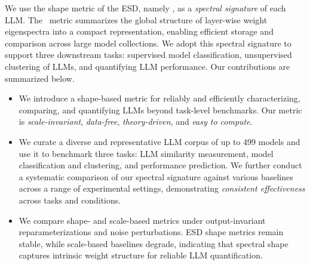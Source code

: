 We use the shape metric of the ESD, namely \ALPHAHILL, as a \emph{spectral signature} of each LLM. The \ALPHAHILL~metric summarizes the global structure of layer-wise weight eigenspectra into a compact representation, enabling efficient storage and comparison across large model collections. We adopt this spectral signature to support three downstream tasks: supervised model classification, unsupervised clustering of LLMs, and quantifying LLM performance.
Our contributions are summarized below.
%
\begin{itemize}
    \item We introduce a shape-based metric for reliably and efficiently characterizing, comparing, and quantifying LLMs beyond task-level benchmarks. Our metric is \emph{scale-invariant}, \emph{data-free}, \emph{theory-driven}, and \emph{easy to compute}. 
    \item We curate a diverse and representative LLM corpus of up to 499 models and use it to benchmark three tasks: LLM similarity measurement, model classification and clustering, and performance prediction. We further conduct a systematic comparison of our spectral signature against various baselines across a range of experimental settings, demonstrating \emph{consistent effectiveness} across tasks and conditions.
    \item We compare shape- and scale-based metrics under output-invariant reparameterizations and noise perturbations. ESD shape metrics remain stable, while scale-based baselines degrade, indicating that spectral shape captures intrinsic weight structure for reliable LLM quantification.
\end{itemize}


